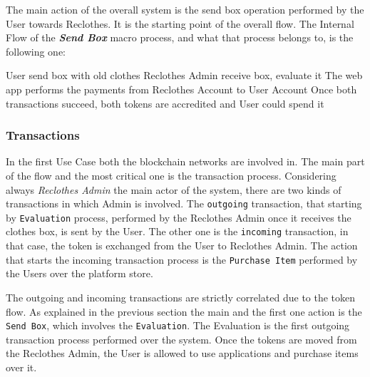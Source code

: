 The main action of the overall system is the send box operation performed by the User towards Reclothes.
It is the starting point of the overall flow. The Internal Flow of the \textit{\bf{Send Box}} macro 
process, and what that process belongs to, is the following one:

\begin{outline}[enumerate]
    \1 User send box with old clothes
    \1 Reclothes Admin receive box, evaluate it
    \1 The web app performs the payments from Reclothes Account to User Account
    \1 Once both transactions succeed, both tokens are accredited and User could spend it
\end{outline}

\subsubsection{Transactions}

In the first Use Case both the blockchain networks are involved in. The main part of the flow and the most critical one is the 
transaction process. Considering always \textit{Reclothes Admin} the main actor of the system, there are two kinds 
of transactions in which Admin is involved. 
The \texttt{outgoing} transaction, that starting by \texttt{Evaluation} process, performed by the Reclothes Admin once 
it receives the clothes box, is sent by the User. The other one is the \texttt{incoming} transaction, in that case, the 
token is exchanged from the User to Reclothes Admin. The action that starts the incoming transaction process is the 
\texttt{Purchase Item} performed by the Users over the platform store.
\bigskip

The outgoing and incoming transactions are strictly correlated due to the token flow. As explained in the previous 
section the main and the first one action is the \texttt{Send Box}, which involves the \texttt{Evaluation}.
The Evaluation is the first outgoing transaction process performed over the system. Once the tokens are moved from the 
Reclothes Admin, the User is allowed to use applications and purchase items over it.

